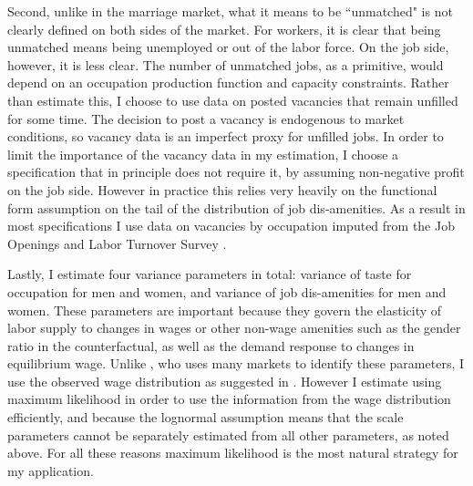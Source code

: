 \documentclass[11pt]{article}
\begin{document}
Second, unlike in the marriage market, what it means to be ``unmatched" is not clearly defined on both sides of the market. For workers, it is clear that being unmatched means being unemployed or out of the labor force. On the job side, however, it is less clear. The number of unmatched jobs, as a primitive, would depend on an occupation production function and capacity constraints. Rather than estimate this, I choose to use data on posted vacancies that remain unfilled for some time. The decision to post a vacancy is endogenous to market conditions, so vacancy data is an imperfect proxy for unfilled jobs. In order to limit the importance of the vacancy data in my estimation, I choose a specification that in principle does not require it, by assuming non-negative profit on the job side. However in practice this relies very heavily on the functional form assumption on the tail of the distribution of job dis-amenities. As a result in most specifications I use data on vacancies by occupation imputed from the Job Openings and Labor Turnover Survey \cite{JOLTS}.

Lastly, I estimate four variance parameters in total: variance of taste for occupation for men and women, and variance of job dis-amenities for men and women. These parameters are important because they govern the elasticity of labor supply to changes in wages or other non-wage amenities such as the gender ratio in the counterfactual, as well as the demand response to changes in equilibrium wage. Unlike , who uses many markets to identify these parameters, I use the observed wage distribution as suggested in . However I estimate using maximum likelihood in order to use the information from the wage distribution efficiently, and because the lognormal assumption means that the scale parameters cannot be separately estimated from all other parameters, as noted above. For all these reasons maximum likelihood is the most natural strategy for my application.



\end{document}
